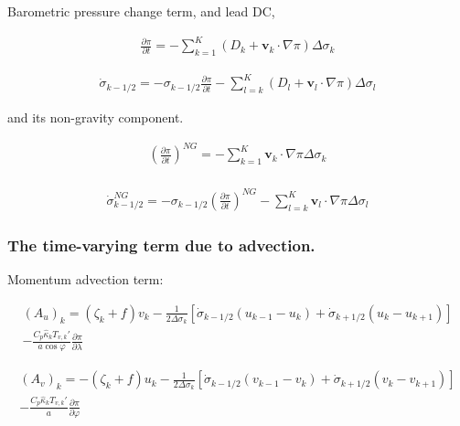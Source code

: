 Barometric pressure change term, and lead DC,

\begin{eqnarray}
  \frac{\partial \pi}{\partial t}
 = - \sum_{k=1}^{K} ( D_k + \mathbf{v}_k \cdot \nabla \pi ) 
       \Delta  \sigma_k
\end{eqnarray}

\begin{eqnarray}
  \dot{\sigma}_{k-1/2}
 = - \sigma_{k-1/2} \frac{\partial \pi}{\partial t}
   - \sum_{l=k}^{K} ( D_l + \mathbf{v}_l \cdot \nabla \pi )          
       \Delta  \sigma_l
\end{eqnarray}

and its non-gravity component.

\begin{eqnarray}
  \left( \frac{\partial \pi}{\partial t} \right)^{NG}
   =   - \sum_{k=1}^{K} \mathbf{v}_{k} \cdot \nabla \pi  
       \Delta  \sigma_{k}  \\
\end{eqnarray}

\begin{eqnarray}
  \dot{\sigma}^{NG}_{k-1/2}
 = - \sigma_{k-1/2} \left( \frac{\partial \pi}{\partial t} \right)^{NG}
   - \sum_{l=k}^{K} \mathbf{v}_{l} \cdot \nabla \pi
       \Delta  \sigma_{l}
\end{eqnarray}

\hypertarget{the-time-varying-term-due-to-advection.}{%
\subsubsection{The time-varying term due to
advection.}\label{the-time-varying-term-due-to-advection.}}

Momentum advection term:

\begin{eqnarray}
  (A_u)_k 
    =  ( \zeta_k + f ) v_k 
             - \frac{1}{2 \Delta \sigma_k} 
             [   \dot{\sigma}_{k-1/2} ( u_{k-1} - u_k   )
               + \dot{\sigma}_{k+1/2} ( u_k   - u_{k+1} ) ]
            \\
           - \frac{C_{p} \hat{\kappa}_k T_{v,k}'}{ a \cos \varphi} 
                  \frac{\partial \pi}{\partial \lambda} 
\end{eqnarray}

\begin{eqnarray}
  (A_v)_k 
    =  - ( \zeta_k + f ) u_k 
             - \frac{1}{2 \Delta \sigma_k} 
             [   \dot{\sigma}_{k-1/2} ( v_{k-1} - v_k   )
               + \dot{\sigma}_{k+1/2} ( v_k   - v_{k+1} ) ]
            \\
           - \frac{C_{p} \hat{\kappa}_k T_{v,k}'}{a} 
             \frac{\partial \pi}{\partial \varphi} 
\end{eqnarray}

